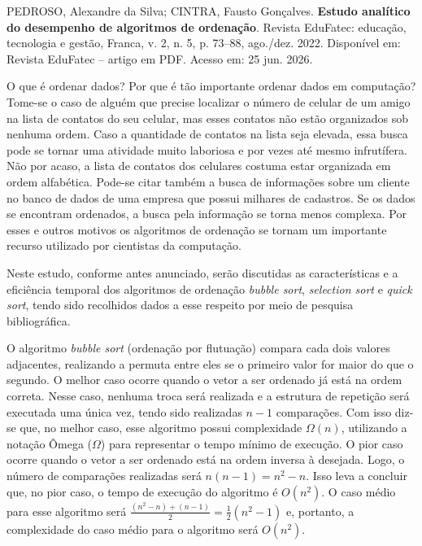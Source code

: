 \documentclass[12pt,a4paper]{article}
\begin{document}
\begin{enumerate}
    PEDROSO, Alexandre da Silva; CINTRA, Fausto Gonçalves. \textbf{Estudo analítico do desempenho de algoritmos de ordenação}. Revista EduFatec: educação, tecnologia e gestão, Franca, v. 2, n. 5, p. 73--88, ago./dez. 2022. Disponível em: Revista EduFatec -- artigo em PDF. Acesso em: 25 jun. 2026.
\vspace{0.3cm}

O que é ordenar dados? Por que é tão importante ordenar dados em computação? Tome-se o caso de alguém que precise localizar o número de celular de um amigo na lista de contatos do seu celular, mas esses contatos não estão organizados sob nenhuma ordem. Caso a quantidade de contatos na lista seja elevada, essa busca pode se tornar uma atividade muito laboriosa e por vezes até mesmo infrutífera. Não por acaso, a lista de contatos dos celulares costuma estar organizada em ordem alfabética. Pode-se citar também a busca de informações sobre um cliente no banco de dados de uma empresa que possui milhares de cadastros. Se os dados se encontram ordenados, a busca pela informação se torna menos complexa. Por esses e outros motivos os algoritmos de ordenação se tornam um importante recurso utilizado por cientistas da computação. 

Neste estudo, conforme antes anunciado, serão discutidas as características e a eficiência temporal dos algoritmos de ordenação \textit{bubble sort}, \textit{selection sort} e \textit{quick sort}, tendo sido recolhidos dados a esse respeito por meio de pesquisa bibliográfica. 

O algoritmo \textit{bubble sort} (ordenação por flutuação) compara cada dois valores adjacentes, realizando a permuta entre eles se o primeiro valor for maior do que o segundo. O melhor caso ocorre quando o vetor a ser ordenado já está na ordem correta. Nesse caso, nenhuma troca será realizada e a estrutura de repetição será executada uma única vez, tendo sido realizadas $n - 1$ comparações. Com isso diz-se que, no melhor caso, esse algoritmo possui complexidade $\Omega(n)$, utilizando a notação Ômega ($\Omega$) para representar o tempo mínimo de execução.
O pior caso ocorre quando o vetor a ser ordenado está na ordem inversa à desejada. Logo, o número de comparações realizadas será $n(n - 1) = n^2 - n$. Isso leva a concluir que, no pior caso, o tempo de execução do algoritmo é $O(n^2)$. O caso médio para esse algoritmo será $\frac{(n^2 - n) + (n - 1)}{2} = \frac{1}{2}(n^2 - 1)$ e, portanto, a complexidade do caso médio para o algoritmo será $O(n^2)$.


\end{enumerate}
\end{document}
